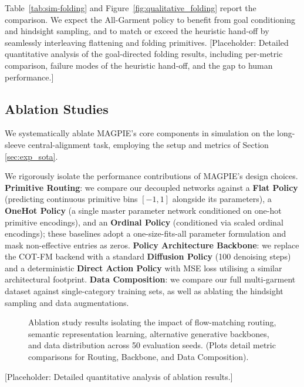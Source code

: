 \documentclass[journal]{IEEEtran}
\begin{document}
Table~\ref{tab:sim-folding} and Figure~\ref{fig:qualitative_folding} report the comparison. We expect the All-Garment policy to benefit from goal conditioning and hindsight sampling, and to match or exceed the heuristic hand-off by seamlessly interleaving flattening and folding primitives.
[Placeholder: Detailed quantitative analysis of the goal-directed folding results, including per-metric comparison, failure modes of the heuristic hand-off, and the gap to human performance.]


\subsection{Ablation Studies}
\label{sec:exp_abl}

We systematically ablate MAGPIE's core components in simulation on the long-sleeve central-alignment task, employing the setup and metrics of Section \ref{sec:exp_sota}.

We rigorously isolate the performance contributions of MAGPIE's design choices. \textbf{Primitive Routing}: we compare our decoupled networks against a \textbf{Flat Policy} (predicting continuous primitive bins $[-1, 1]$ alongside its parameters), a \textbf{OneHot Policy} (a single master parameter network conditioned on one-hot primitive encodings), and an \textbf{Ordinal Policy} (conditioned via scaled ordinal encodings); these baselines adopt a one-size-fits-all parameter formulation and mask non-effective entries as zeros. \textbf{Policy Architecture Backbone}: we replace the COT-FM backend with a standard \textbf{Diffusion Policy} (100 denoising steps) and a deterministic \textbf{Direct Action Policy} with MSE loss utilising a similar architectural footprint. \textbf{Data Composition}: we compare our full multi-garment dataset against single-category training sets, as well as ablating the hindsight sampling and data augmentations.

\begin{figure}[!h]
    \centering
    \caption{Ablation study results isolating the impact of flow-matching routing, semantic representation learning, alternative generative backbones, and data distribution across 50 evaluation seeds. (Plots detail metric comparisons for Routing, Backbone, and Data Composition).}
    \label{fig:ablations}
\end{figure}

[Placeholder: Detailed quantitative analysis of ablation results.]
\end{document}

